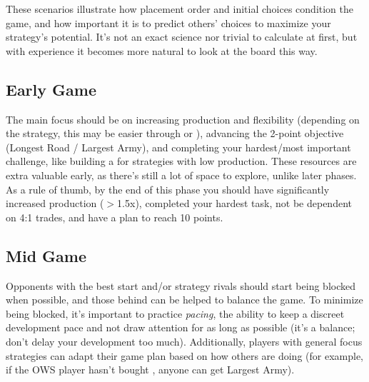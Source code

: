 \documentclass[12pt]{article}
\begin{document}
\noindent These scenarios illustrate how placement order and initial choices condition the game, and how important it is to predict others' choices to maximize your strategy's potential.
It's not an exact science nor trivial to calculate at first, but with experience it becomes more natural to look at the board this way.

\subsection{Early Game}
The main focus should be on increasing production and flexibility (depending on the strategy, this may be easier through  or ), advancing the 2-point objective (Longest Road / Largest Army), and completing your hardest/most important challenge, like building a  for strategies with low  production.
These resources are extra valuable early, as there's still a lot of space to explore, unlike later phases.
As a rule of thumb, by the end of this phase you should have significantly increased production ($>$1.5x), completed your hardest task, not be dependent on 4:1 trades, and have a plan to reach 10 points.

\subsection{Mid Game}
Opponents with the best start and/or strategy rivals should start being blocked when possible, and those behind can be helped to balance the game.
To minimize being blocked, it's important to practice \textit{pacing}, the ability to keep a discreet development pace and not draw attention for as long as possible (it's a balance; don't delay your development too much).
Additionally, players with general focus strategies can adapt their game plan based on how others are doing (for example, if the OWS player hasn't bought , anyone can get Largest Army).
\end{document}
